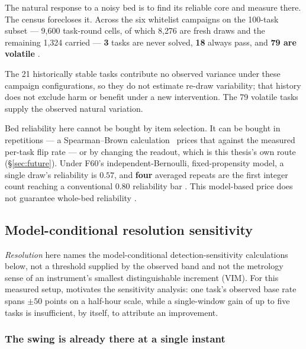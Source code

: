 The natural response to a noisy bed is to find its reliable core and
measure there. The census forecloses it. Across the six whitelist campaigns on the 100-task subset ---
9{,}600 task-round cells, of which 8{,}276 are fresh draws and the
remaining 1{,}324 carried  --- \textbf{3} tasks are never solved,
\textbf{18} always pass, and \textbf{79 are volatile} .

The 21 historically stable tasks contribute no observed variance under
these campaign configurations, so they do not estimate re-draw variability;
that history does not exclude harm or benefit under a new intervention. The
79 volatile tasks supply the observed natural variation.

Bed reliability here cannot be bought by item selection. It can be bought
in repetitions --- a Spearman--Brown calculation~\cite{spearman-1910,brown-1910} prices that against the
measured per-task flip rate --- or by changing the readout, which is this
thesis's own route (\S\ref{sec:future}). Under F60's independent-Bernoulli, fixed-propensity model, a single draw's
reliability is $0.57$, and \textbf{four} averaged repeats are the first
integer count reaching a conventional $0.80$ reliability bar . This model-based
price does not guarantee whole-bed reliability .



\subsection{Model-conditional resolution sensitivity}
\label{sec:resolution}

\emph{Resolution} here names the model-conditional detection-sensitivity
calculations below, not a threshold supplied by the observed band and not
the metrology sense of an instrument's smallest distinguishable increment
(VIM). For this measured setup,  motivates the sensitivity analysis:
one task's observed base rate spans $\pm 50$ points on a half-hour scale,
while a single-window gain of up to five tasks is insufficient, by itself,
to attribute an improvement.

\subsubsection*{The swing is already there at a single instant}

